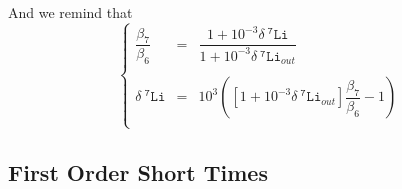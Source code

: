 \documentclass[aps,onecolumn,12pt]{revtex4}
\newcommand{\mychem}[1]{\mathtt{#1}}
\newcommand{\spLi}[1]{{~^{\mychem{#1}}\mychem{Li}}}
\newcommand{\deltaLi}{ {\delta\!\!\!\spLi{7}} }
\newcommand{\ih}{\ensuremath{\mathbf{H}}}
\begin{document}
And we remind that
\begin{equation}
\left\lbrace
\begin{array}{rcl}
	\dfrac{\beta_7}{\beta_6} & = & \dfrac{1+10^{-3}\deltaLi}{1+10^{-3}\deltaLi_{out}} \\
	\\
	\deltaLi & = & 10^3 \left( \left[1+10^{-3}\deltaLi_{out}\right] \dfrac{\beta_7}{\beta_6} - 1 \right)\\
\end{array}
\right.
\end{equation}

\subsection{First Order Short Times}



\end{document}
